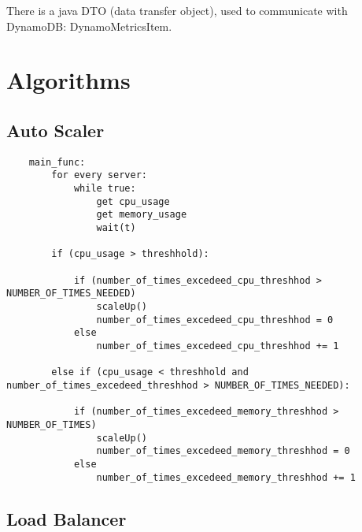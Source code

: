 \documentclass[10pt,twocolumn]{article}
\begin{document}
There is a java DTO (data transfer object), used to communicate with DynamoDB: DynamoMetricsItem.

\section{Algorithms}

\subsection*{Auto Scaler}

\begin{verbatim}
    main_func:
        for every server:
            while true:
                get cpu_usage
                get memory_usage
                wait(t)

        if (cpu_usage > threshhold):

            if (number_of_times_excedeed_cpu_threshhod > NUMBER_OF_TIMES_NEEDED)
                scaleUp()
                number_of_times_excedeed_cpu_threshhod = 0
            else
                number_of_times_excedeed_cpu_threshhod += 1

        else if (cpu_usage < threshhold and number_of_times_excedeed_threshhod > NUMBER_OF_TIMES_NEEDED):

            if (number_of_times_excedeed_memory_threshhod > NUMBER_OF_TIMES)
                scaleUp()
                number_of_times_excedeed_memory_threshhod = 0
            else
                number_of_times_excedeed_memory_threshhod += 1
\end{verbatim}

\subsection*{Load Balancer}
\end{document}
